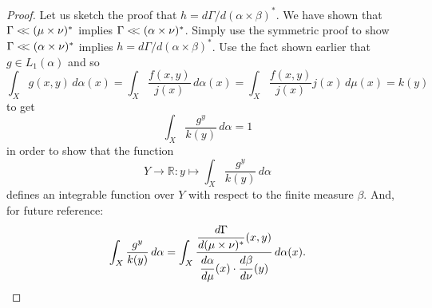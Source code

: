 \documentclass[
twoside=true,
paper=letter,
fontsize=11pt,
pagesize=auto,
leqno,
openany,
headsepline,
overfullrule,
]{scrbook}
\theoremstyle{plain}
\theoremstyle{plain}
\theoremstyle{definition}
\theoremstyle{bfnoteitalic}
\theoremstyle{bfnoteroman}
\newcommand{\R}{\mathbb{R}}
\newcommand{\lilstrut}{\vphantom{\bigl(}}
\newcommand{\funcf}{f}
\newcommand{\funcg}{g}
\newcommand{\funck}{k}
\newcommand{\funcj}{j}
\newcommand{\functioniii}{h}
\newcommand{\measurespace}{X}
\newcommand{\measurespaceii}{Y}
\newcommand{\mspaceelt}{x}
\newcommand{\mspaceeltii}{y}
\newcommand{\abscont}{\mathrel{< \kern-3.5pt <}}
\newcommand{\measure}{\mu}
\newcommand{\measmu}{\mu}
\newcommand{\measureii}{\nu}
\newcommand{\measnu}{\nu}
\newcommand{\joint}{\Gamma}%
\newcommand{\measonprod}{\Gamma}%
\newcommand{\marginalone}{\alpha}%
\newcommand{\marginaltwo}{\beta}%
\begin{document}
\begin{proof}
Let us sketch the proof that
$\functioniii
=
d\measonprod / d(\marginalone\times\marginaltwo)^*$.
We have shown that 
$\measonprod \abscont (\measure\times\measureii)^*$
implies
$\measonprod \abscont (\marginalone\times\measureii)^*$. 
Simply use the symmetric proof to show 
$\measonprod \abscont (\marginalone\times\measureii)^*$
implies
$\functioniii
=
d\measonprod / d(\marginalone\times\marginaltwo)^*$.
Use the fact shown earlier that 
$\funcg\in L_1(\marginalone)$ and so 
\[
\int_\measurespace\funcg(\mspaceelt,\mspaceeltii)\,d\marginalone(\mspaceelt)
=
\int_\measurespace
\frac{\funcf(\mspaceelt,\mspaceeltii)}{\funcj(\mspaceelt)}
\,d\marginalone(\mspaceelt)
=
\int_\measurespace
\frac{\funcf(\mspaceelt,\mspaceeltii)}{\funcj(\mspaceelt)}
\funcj(\mspaceelt)
\,d\measure(\mspaceelt)
=
\funck(\mspaceeltii)
\]
to get
\[
\int_\measurespace
\frac{\funcg^\mspaceeltii}{\funck(\mspaceeltii)}
\, d\marginalone
= 1
\]
in order to show that the function 
\[
\measurespaceii\to\R :
\mspaceeltii\mapsto
\int_\measurespace
\frac{\funcg^\mspaceeltii}{\funck(\mspaceeltii)}
\, d\marginalone
\]
defines an integrable function over $\measurespaceii$ with respect to the finite measure $\marginaltwo$.
And, for future reference:
\[
\int_\measurespace
\frac{\funcg^\mspaceeltii}{\funck(\mspaceeltii)}
\, d\marginalone
=
\int_\measurespace
\frac{\dfrac{d\joint}{d(\measmu\times\measnu)^*}
(\mspaceelt,\mspaceeltii)}
{\dfrac{d\marginalone\lilstrut}{d\measmu}(\mspaceelt)
\cdot
\dfrac{d\marginaltwo\lilstrut}{d\measnu}(\mspaceeltii)}
\,d\marginalone(\mspaceelt).
\]
\end{proof}
\end{document}
